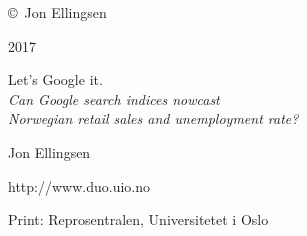 \copyright \ Jon Ellingsen

\vspace{0.5cm}

2017

\vspace{0.5cm}

Let's Google it. \\
\indent \textit{Can Google search indices nowcast\\ \indent Norwegian retail sales and unemployment rate?}

\vspace{0.5cm}

Jon Ellingsen

\vspace{0.5cm}

http://www.duo.uio.no

\vspace{0.5cm}

Print: Reprosentralen, Universitetet i Oslo